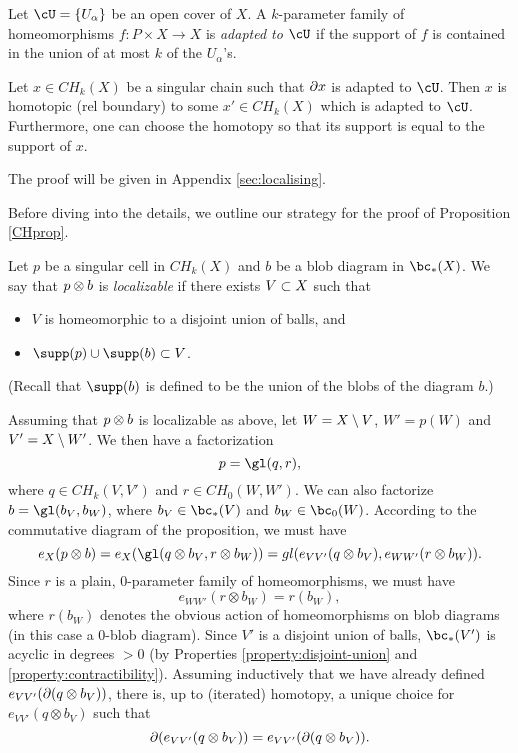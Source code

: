 Let $\cU = \{U_\alpha\}$ be an open cover of $X$.
A $k$-parameter family of homeomorphisms $f: P \times X \to X$ is
{\it adapted to $\cU$} 
if the support of $f$ is contained in the union
of at most $k$ of the $U_\alpha$'s.

\begin{lemma}  \label{extension_lemma}
Let $x \in CH_k(X)$ be a singular chain such that $\partial x$ is adapted to $\cU$.
Then $x$ is homotopic (rel boundary) to some $x' \in CH_k(X)$ which is adapted to $\cU$.
Furthermore, one can choose the homotopy so that its support is equal to the support of $x$.
\end{lemma}

The proof will be given in Appendix \ref{sec:localising}.

\medskip

Before diving into the details, we outline our strategy for the proof of Proposition \ref{CHprop}.

Let $p$ be a singular cell in $CH_k(X)$ and $b$ be a blob diagram in $\bc_*(X)$.
We say that $p\otimes b$ is {\it localizable} if there exists $V \subset X$ such that
\begin{itemize}
\item $V$ is homeomorphic to a disjoint union of balls, and
\item $\supp(p) \cup \supp(b) \sub V$.
\end{itemize}
(Recall that $\supp(b)$ is defined to be the union of the blobs of the diagram $b$.)

Assuming that $p\otimes b$ is localizable as above, 
let $W = X \setminus V$, $W' = p(W)$ and $V' = X\setminus W'$.
We then have a factorization 
\[
	p = \gl(q, r),
\]
where $q \in CH_k(V, V')$ and $r \in CH_0(W, W')$.
We can also factorize $b = \gl(b_V, b_W)$, where $b_V\in \bc_*(V)$ and $b_W\in\bc_0(W)$.
According to the commutative diagram of the proposition, we must have
\[
	e_X(p\otimes b) = e_X(\gl(q\otimes b_V, r\otimes b_W)) = 
				gl(e_{VV'}(q\otimes b_V), e_{WW'}(r\otimes b_W)) .
\]
Since $r$ is a plain, 0-parameter family of homeomorphisms, we must have
\[
	e_{WW'}(r\otimes b_W) = r(b_W),
\]
where $r(b_W)$ denotes the obvious action of homeomorphisms on blob diagrams (in
this case a 0-blob diagram).
Since $V'$ is a disjoint union of balls, $\bc_*(V')$ is acyclic in degrees $>0$ 
(by Properties \ref{property:disjoint-union} and \ref{property:contractibility}).
Assuming inductively that we have already defined $e_{VV'}(\partial(q\otimes b_V))$,
there is, up to (iterated) homotopy, a unique choice for $e_{VV'}(q\otimes b_V)$
such that 
\[
	\partial(e_{VV'}(q\otimes b_V)) = e_{VV'}(\partial(q\otimes b_V)) .
\]

